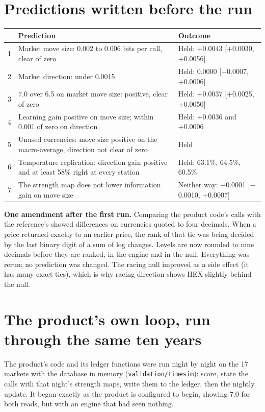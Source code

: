 \documentclass[10.5pt]{article}
\begin{document}
\section{Predictions written before the run}
\begin{center}\small\begin{tabular}{@{}cp{8.2cm}p{5.8cm}@{}}\toprule
 & Prediction & Outcome\\\midrule
1 & Market move size: 0.002 to 0.006 bits per call, clear of zero & Held: +0.0043 [+0.0030, +0.0056]\\
2 & Market direction: under 0.0015 & Held: 0.0000 [$-$0.0007, +0.0006]\\
3 & 7.0 over 6.5 on market move size: positive, clear of zero & Held: +0.0037 [+0.0025, +0.0050]\\
4 & Learning gain positive on move size; within 0.001 of zero on direction & Held: +0.0036 and +0.0006\\
5 & Unused currencies: move size positive on the macro-average, direction not clear of zero & Held\\
6 & Temperature replication: direction gain positive and at least 58\% right at every station & Held: 63.1\%, 64.5\%, 60.5\%\\
7 & The strength map does not lower information gain on move size & Neither way: $-$0.0001 [$-$0.0010, +0.0007]\\\bottomrule\end{tabular}\end{center}
\textbf{One amendment after the first run.} Comparing the product code's calls with the reference's showed differences on currencies quoted to four decimals. When a price returned exactly to an earlier price, the rank of that tie was being decided by the last binary digit of a sum of log changes. Levels are now rounded to nine decimals before they are ranked, in the engine and in the null. Everything was rerun; no prediction was changed. The racing null improved as a side effect (it has many exact ties), which is why racing direction shows HEX slightly behind the null.

\section{The product's own loop, run through the same ten years}
The product's code and its ledger functions were run night by night on the 17 markets with the database in memory (\texttt{validation/timesim}): score, state the calls with that night's strength maps, write them to the ledger, then the nightly update. It began exactly as the product is configured to begin, showing 7.0 for both reads, but with an engine that had seen nothing.
\end{document}
